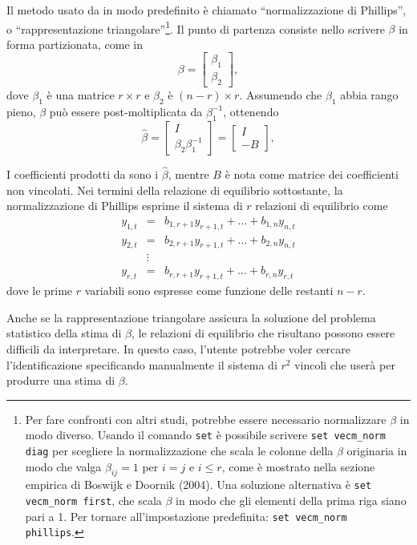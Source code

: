 Il metodo usato da  in modo predefinito è chiamato ``normalizzazione
di Phillips'', o ``rappresentazione triangolare''\footnote{Per fare confronti
  con altri studi, potrebbe essere necessario normalizzare $\beta$ in modo
  diverso. Usando il comando \texttt{set} è possibile scrivere
  \verb|set vecm_norm diag| per scegliere la normalizzazione che scala
  le colonne della $\beta$ originaria in modo che valga $\beta_{ij} = 1$ per $i=j$
  e $i \leq r$, come è mostrato nella sezione empirica di Boswijk e
  Doornik (2004).  Una soluzione alternativa è \verb+set vecm_norm first+,
  che scala $\beta$ in modo che gli elementi della prima riga siano pari a 1.
  Per tornare all'impostazione predefinita: \texttt{set vecm\_norm phillips}.
}. Il punto di partenza consiste nello scrivere $\beta$ in forma partizionata, come in
\[
  \beta = \left[
    \begin{array}{c} \beta_1 \\ \beta_2  \end{array}
    \right] ,
\]
dove $\beta_1$ è una matrice $r \times r$ e  $\beta_2$ è $(n-r)
\times r$. Assumendo che $\beta_1$ abbia rango pieno, $\beta$ può essere
post-moltiplicata da $\beta_1^{-1}$, ottenendo
\[
  \hat{\beta} = \left[
    \begin{array}{c} I \\ \beta_2 \beta_1^{-1}  \end{array}
    \right] =
    \left[
    \begin{array}{c} I \\ -B \end{array}
  \right]  ,
\]

I coefficienti prodotti da  sono i $\hat{\beta}$, mentre
$B$ è nota come matrice dei coefficienti non vincolati. Nei termini della
relazione di equilibrio sottostante, la normalizzazione di Phillips
esprime il sistema di $r$ relazioni di equilibrio come
  \begin{eqnarray}
    y_{1,t} & = & b_{1,r+1} y_{r+1,t} + \ldots + b_{1,n} y_{n,t} \\
    y_{2,t} & = & b_{2,r+1} y_{r+1,t} + \ldots + b_{2,n} y_{n,t} \\
    & \vdots & \\
    y_{r,t} & = & b_{r,r+1} y_{r+1,t} + \ldots + b_{r,n} y_{r,t} 
  \end{eqnarray}
dove le prime $r$ variabili sono espresse come funzione delle restanti
$n-r$.

Anche se la rappresentazione triangolare assicura la soluzione del problema
statistico della stima di $\beta$, le relazioni di equilibrio che risultano
possono essere difficili da interpretare. In questo caso, l'utente potrebbe
voler cercare l'identificazione specificando manualmente il sistema di
$r^2$ vincoli che  userà per produrre una stima di
$\beta$.

